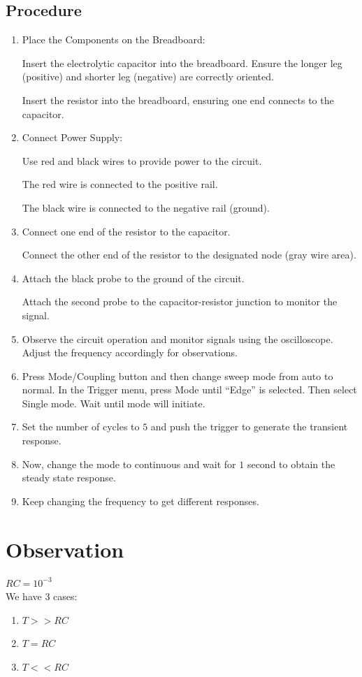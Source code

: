 \documentclass[a4paper,12pt]{article}
\begin{document}
\subsection{Procedure}

\begin{enumerate}
    \item Place the Components on the Breadboard:

Insert the electrolytic capacitor into the breadboard. Ensure the longer leg (positive) and shorter leg (negative) are correctly oriented.

Insert the resistor into the breadboard, ensuring one end connects to the capacitor.
     \item Connect Power Supply:

Use red and black wires to provide power to the circuit.

The red wire is connected to the positive rail.

The black wire is connected to the negative rail (ground).
    \item Connect one end of the resistor to the capacitor.

Connect the other end of the resistor to the designated node (gray wire area).
   \item Attach the black probe to the ground of the circuit.

Attach the second probe to the capacitor-resistor junction to monitor the signal.
   \item Observe the circuit operation and monitor signals using the oscilloscope. Adjust the frequency accordingly for observations.

   \item Press Mode/Coupling button and then change sweep mode from auto to normal.
   In the Trigger menu, press Mode until “Edge” is selected.
   Then select Single mode. Wait until mode will initiate.

   \item Set the number of cycles to $5$ and push the trigger to generate the transient response. 

    \item Now, change the mode to continuous and wait for $1$ second to obtain the steady state response.

    \item Keep changing the frequency to get different responses. 
    
\end{enumerate}

\section{Observation}
$RC=10^{-3}$\\
We have 3 cases:
\begin{enumerate}
    \item $T>>RC$
     \item $T=RC$
      \item $T<<RC$
\end{enumerate}
\end{document}
